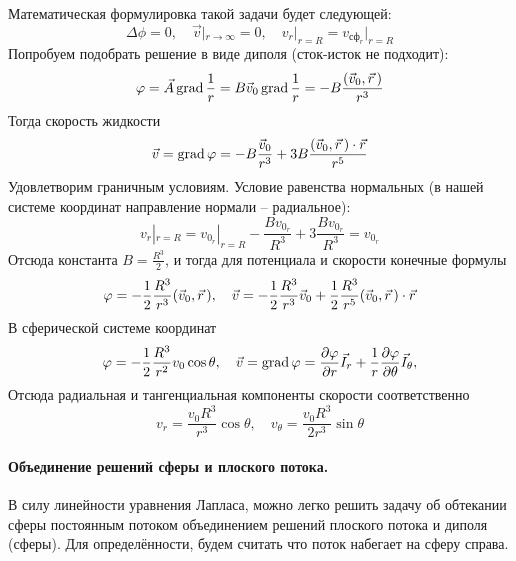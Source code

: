 Математическая формулировка такой задачи будет следующей:
\begin{equation}
    \Delta \phi = 0, \quad
    \vec{v} |_{r\to \infty}=0, \quad
    v_r |_{r=R}=v_{\text{сф}_r}|_{r=R}
\end{equation}
Попробуем подобрать решение в виде диполя (сток-исток не подходит):
\begin{equation}
    \varphi = \vec{A} \operatorname{grad} \frac{1}{r} = B \vec{v}_0 \operatorname{grad} \frac{1}{r}=
    -B \frac{\qty(\vec{v}_0,\vec{r}\,)}{r^3}
\end{equation}
Тогда скорость жидкости
\begin{equation}
    \vec{v} = \operatorname{grad} \varphi = -B \frac{\vec{v}_0}{r^3} +
    3B \frac{(\vec{v}_0,\vec{r}\,)\cdot \vec{r}}{r^5}
\end{equation}
Удовлетворим граничным условиям. Условие равенства нормальных (в нашей системе координат направление нормали -- радиальное):
\begin{equation}
    v_r |_{r=R}= v_{0_r}|_{r=R}
    -\frac{B{v_{0_r}}}{R^3}
    +3\frac{B v_{0_r}}{R^3} = v_{0_r} 
\end{equation}
Отсюда константа $B=\frac{R^3}{2}$, и тогда для потенциала и скорости конечные формулы
\begin{equation}
    \varphi = -\frac{1}{2} \frac{R^3}{r^3} \qty(\vec{v}_0,\vec{r}\,), \quad
    \vec{v} = -\frac{1}{2} \frac{R^3}{r^3} \vec{v}_0
    +\frac{1}{2} \frac{R^3}{r^5} (\vec{v}_0,\vec{r}\,)\cdot \vec{r}
\end{equation}
В сферической системе координат
\begin{equation}
    \varphi = -\frac{1}{2} \frac{R^3}{r^2} v_0 \cos\theta, \quad
    \vec{v} = \operatorname{grad}\varphi = \pdv{\varphi}{r} \vec{I}_r +
    \frac{1}{r} \pdv{\varphi}{\theta} \vec{I}_\theta,
\end{equation}
Отсюда радиальная и тангенциальная компоненты скорости соответственно
\begin{equation}
    v_r= \frac{v_0 R^3}{r^3}\cos\theta, \quad
    v_\theta = \frac{v_0 R^3}{2r^3} \sin\theta
\end{equation}

\paragraph{Объединение решений сферы и плоского потока.} В силу линейности уравнения Лапласа, можно легко решить задачу об обтекании сферы постоянным потоком объединением решений плоского потока и диполя (сферы). Для определённости, будем считать что поток набегает на сферу справа. 

